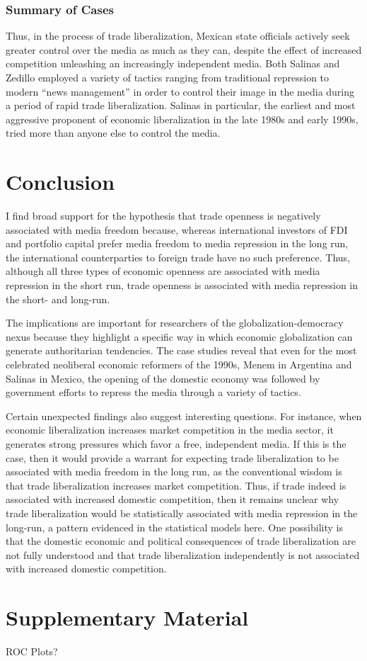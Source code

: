 \documentclass[a4paper]{article}\usepackage[]{graphicx}\usepackage[]{color}
\begin{document}
\subsubsection{Summary of Cases}

Thus, in the process of trade liberalization, Mexican state officials actively seek greater control over the media as much as they can, despite the effect of increased competition unleashing an increasingly independent media. Both Salinas and Zedillo employed a variety of tactics ranging from traditional repression to modern “news management” in order to control their image in the media during a period of rapid trade liberalization. Salinas in particular, the earliest and most aggressive proponent of economic liberalization in the late 1980s and early 1990s, tried more than anyone else to control the media.

\section{Conclusion}

I find broad support for the hypothesis that trade openness is negatively associated with media freedom because, whereas international investors of FDI and portfolio capital prefer media freedom to media repression in the long run, the international counterparties to foreign trade have no such preference. Thus, although all three types of economic openness are associated with media repression in the short run, trade openness is associated with media repression in the short- and long-run.

The implications are important for researchers of the globalization-democracy nexus because they highlight a specific way in which economic globalization can generate authoritarian tendencies. The case studies reveal that even for the most celebrated neoliberal economic reformers of the 1990s, Menem in Argentina and Salinas in Mexico, the opening of the domestic economy was followed by government efforts to repress the media through a variety of tactics. 

Certain unexpected findings also suggest interesting questions. For instance, when economic liberalization increases market competition in the media sector, it generates strong pressures which favor a free, independent media. If this is the case, then it would provide a warrant for expecting trade liberalization to be associated with media freedom in the long run, as the conventional wisdom is that trade liberalization increases market competition. Thus, if trade indeed is associated with increased domestic competition, then it remains unclear why trade liberalization would be statistically associated with media repression in the long-run, a pattern evidenced in the statistical models here. One possibility is that the domestic economic and political consequences of trade liberalization are not fully understood and that trade liberalization independently is not associated with increased domestic competition.

\pagebreak
\begingroup
{}
\setlength\bibitemsep{7pt}
\printbibliography
\endgroup

\section{Supplementary Material}

ROC Plots?
\end{document}
